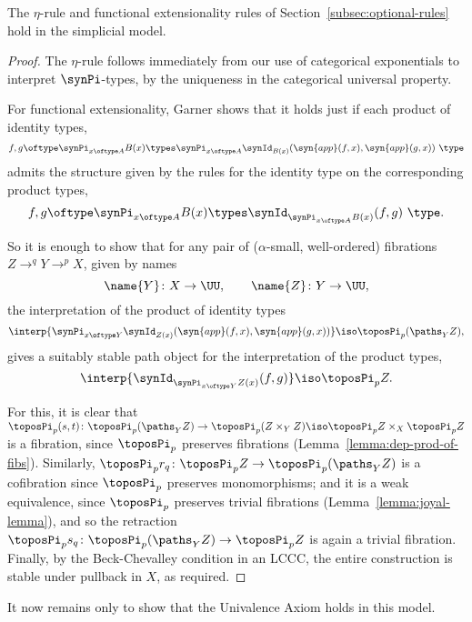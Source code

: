 \begin{proposition} \label{prop:eta-and-funext}
The $\eta$-rule and functional extensionality rules of Section~\ref{subsec:optional-rules} hold in the simplicial model.
\end{proposition}

\begin{proof}
The $\eta$-rule follows immediately from our use of categorical exponentials to interpret $\synPi$-types, by the uniqueness in the categorical universal property.

For functional extensionality, Garner \cite[Sec.~5]{garner:on-the-strength} shows that it holds just if each product of identity types, 
\[ f, g \oftype \synPi_{x \oftype A} B(x) \types \synPi_{x \oftype A} \synId_{B(x)} (\syn{app}(f,x),\syn{app}(g,x))\ \type\]
admits the structure given by the rules for the identity type on the corresponding product types,
\[f,g \oftype \synPi_{x \oftype A} B(x) \types \synId_{\synPi_{x \oftype A} B(x)} (f,g)\ \type . \]

So it is enough to show that for any pair of ($\alpha$-small, well-ordered) fibrations $Z \to^q Y \to^p X$, given by names
\[ \name{Y} \colon X \to \UU, \qquad \name{Z} \colon Y \to \UU,\]
the interpretation of the product of identity types
\[ \interp{\synPi_{x \oftype Y} \synId_{Z(x)} (\syn{app}(f,x),\syn{app}(g,x)) } \iso \toposPi_p (\paths_Y Z),\]
 gives a suitably stable path object for the interpretation of the product types, 
\[ \interp{\synId_{\synPi_{x \oftype Y} Z(x)} (f,g)} \iso \toposPi_p Z.\]

For this, it is clear that $\toposPi_p (s,t) \colon \toposPi_p (\paths_Y Z) \to \toposPi_p (Z \times_Y Z) \iso \toposPi_p Z \times_X \toposPi_p Z$ is a fibration, since $\toposPi_p$ preserves fibrations (Lemma~\ref{lemma:dep-prod-of-fibs}). Similarly, $\toposPi_p r_q \colon \toposPi_p Z \to \toposPi_p (\paths_Y Z)$ is a cofibration since $\toposPi_p$ preserves monomorphisms; and it is a weak equivalence, since $\toposPi_p$ preserves trivial fibrations (Lemma~\ref{lemma:joyal-lemma}), and so the retraction $\toposPi_p s_q \colon \toposPi_p (\paths_Y Z) \to \toposPi_p Z$ is again a trivial fibration.  Finally, by the Beck-Chevalley condition in an LCCC, the entire construction is stable under pullback in $X$, as required.
\end{proof}

It now remains only to show that the Univalence Axiom holds in this model.

